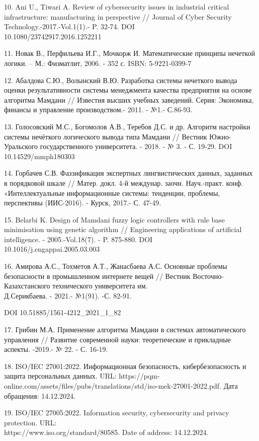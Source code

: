 \begin{references}
10. Ani U., Tiwari A. Review of cybersecurity issues in industrial
critical infrastructure: manufacturing in perspective // Journal of
Cyber Security Technology.-2017.-Vol.1(1).- P. 32-74. DOI\\
10.1080/23742917.2016.1252211

11. Новак В., Перфильева И.Г., Мочкорж И. Математические принципы
нечеткой логики. -- М.: Физматлит, 2006. - 352 с. ISBN: 5-9221-0399-7

12. Абалдова С.Ю., Волынский В.Ю. Разработка системы нечеткого вывода
оценки результативности системы менеджмента качества предприятия на
основе алгоритма Мамдани // Известия высших учебных заведений. Серия:
Экономика, финансы и управление производством.- 2011. - №1.- С.86-93.

13. Голосовский М.С., Богомолов А.В., Теребов Д.С. и др. Алгоритм
настройки системы нечёткого логического вывода типа Мамдани // Вестник
Южно-Уральского государственного университета. - 2018. - № 3. - С.
19-29. DOI 10.14529/mmph180303

14. Горбачев С.В. Фаззификация экспертных лингвистических данных,
заданных в порядковой шкале // Матер. докл. 4-й междунар. заочн.
Науч.-практ. конф. «Интеллектуальные информационные системы: тенденции,
проблемы, перспективы (ИИС-2016). - Курск, 2017.- С. 47-49.

15. Belarbi K. Design of Mamdani fuzzy logic controllers with rule base
minimisation using genetic algorithm // Engineering applications of
artificial intelligence. - 2005.-Vol.18(7). - P. 875-880. DOI\\
10.1016/j.engappai.2005.03.003

16. Амирова А.С., Тохметов А.Т., Жанасбаева А.С. Основные проблемы
безопасности в промышленном интернете вещей // Вестник
Восточно-Казахстанского технического университета им. \\Д.Серикбаева. -
2021.- №1(91). -С. 82-91.

DOI 10.51885/1561-4212\_2021\_1\_82

17. Грибин М.А. Применение алгоритма Мамдани в системах автоматического
управления // Развитие современной науки: теоретические и прикладные
аспекты. -2019.- № 22. - С. 16-19.

18. ISO/IEC 27001:2022. Информационная безопасность, кибербезопасность и
защита персональных данных. URL:
https://pqm-online.com/assets/files/pubs/translations/std/iso-mek-27001-2022.pdf.
Дата \\обращения: 14.12.2024.

19. ISO/IEC 27005:2022. Information security, cybersecurity and privacy
protection. URL: \\https://www.iso.org/standard/80585. Date of address:
14.12.2024.


\end{references}
